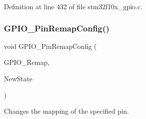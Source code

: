 Definition at line 432 of file stm32f10x\+\_\+gpio.\+c.

\mbox{\label{group___g_p_i_o___exported___functions_ga64eb76f6211b840daf9829289df4208b}} 
\subsubsection{\texorpdfstring{G\+P\+I\+O\+\_\+\+Pin\+Remap\+Config()}{GPIO\_PinRemapConfig()}}
{\footnotesize\ttfamily void G\+P\+I\+O\+\_\+\+Pin\+Remap\+Config (\begin{DoxyParamCaption}\item[{uint32\+\_\+t}]{G\+P\+I\+O\+\_\+\+Remap,  }\item[{\hyperlink{group___exported__types_gac9a7e9a35d2513ec15c3b537aaa4fba1}{Functional\+State}}]{New\+State }\end{DoxyParamCaption})}



Changes the mapping of the specified pin. 


